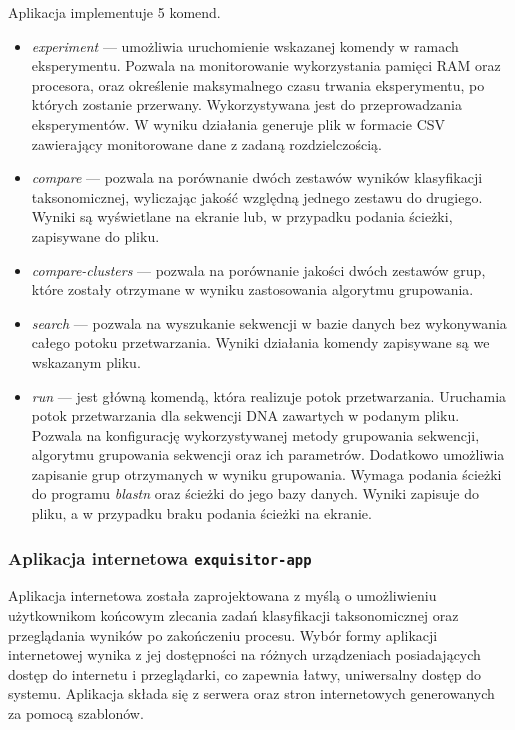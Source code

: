             Aplikacja implementuje 5 komend.
            \begin{itemize}
                \item {
                    \textit{experiment} --- umożliwia uruchomienie wskazanej komendy w ramach eksperymentu. Pozwala na monitorowanie wykorzystania pamięci RAM oraz procesora, oraz określenie maksymalnego czasu trwania eksperymentu, po których zostanie przerwany. Wykorzystywana jest do przeprowadzania eksperymentów. W wyniku działania generuje plik w formacie CSV zawierający monitorowane dane z zadaną rozdzielczością.
                }
                \item {
                    \textit{compare} --- pozwala na porównanie dwóch zestawów wyników klasyfikacji taksonomicznej, wyliczając jakość względną jednego zestawu do drugiego. Wyniki są wyświetlane na ekranie lub, w przypadku podania ścieżki, zapisywane do pliku.
                }
                \item {
                    \textit{compare-clusters} --- pozwala na porównanie jakości dwóch zestawów grup, które zostały otrzymane w wyniku zastosowania algorytmu grupowania.
                }
                \item {
                    \textit{search} --- pozwala na wyszukanie sekwencji w bazie danych bez wykonywania całego potoku przetwarzania. Wyniki działania komendy zapisywane są we wskazanym pliku.
                }
                \item {
                    \textit{run} --- jest główną komendą, która realizuje potok przetwarzania. Uruchamia potok przetwarzania dla sekwencji DNA zawartych w podanym pliku. Pozwala na konfigurację wykorzystywanej metody grupowania sekwencji, algorytmu grupowania sekwencji oraz ich parametrów. Dodatkowo umożliwia zapisanie grup otrzymanych w wyniku grupowania. Wymaga podania ścieżki do programu \textit{blastn} oraz ścieżki do jego bazy danych. Wyniki zapisuje do pliku, a w przypadku braku podania ścieżki na ekranie.
                }
            \end{itemize}

        \subsubsection{Aplikacja internetowa \texttt{exquisitor-app}}
            Aplikacja internetowa została zaprojektowana z myślą o umożliwieniu użytkownikom końcowym zlecania zadań klasyfikacji taksonomicznej oraz przeglądania wyników po zakończeniu procesu. Wybór formy aplikacji internetowej wynika z jej dostępności na różnych urządzeniach posiadających dostęp do internetu i przeglądarki, co zapewnia łatwy, uniwersalny dostęp do systemu. Aplikacja składa się z serwera oraz stron internetowych generowanych za pomocą szablonów.

